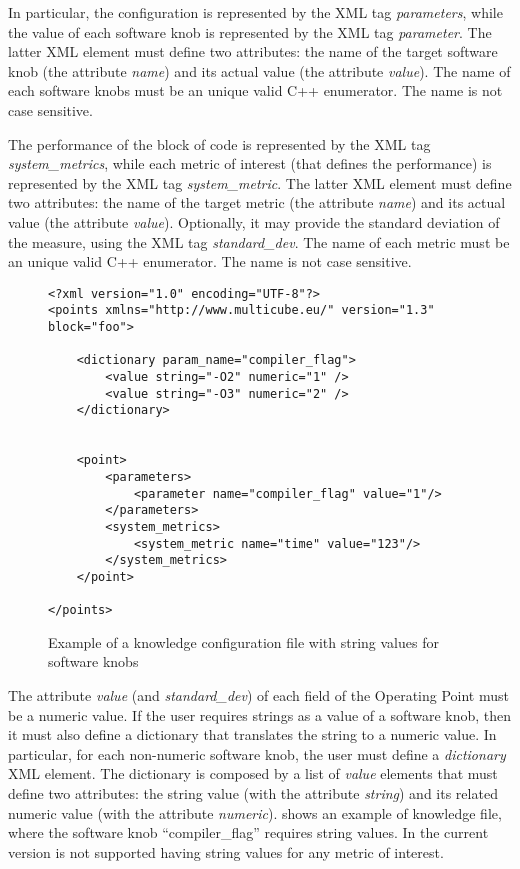 In particular, the configuration is represented by the XML tag \textit{parameters}, while the value of each software knob is represented by the XML tag \textit{parameter}.
The latter XML element must define two attributes: the name of the target software knob (the attribute \textit{name}) and its actual value (the attribute \textit{value}).
The name of each software knobs must be an unique valid C++ enumerator.
The name is not case sensitive.

The performance of the block of code is represented by the XML tag \textit{system\_metrics}, while each metric of interest (that defines the performance) is represented by the XML tag \textit{system\_metric}.
The latter XML element must define two attributes: the name of the target metric (the attribute \textit{name}) and its actual value (the attribute \textit{value}).
Optionally, it may provide the standard deviation of the measure, using the XML tag \textit{standard\_dev}.
The name of each metric must be an unique valid C++ enumerator.
The name is not case sensitive.

\begin{figure}
\lstset{language=XML}
\begin{lstlisting}
<?xml version="1.0" encoding="UTF-8"?>
<points xmlns="http://www.multicube.eu/" version="1.3" block="foo">

	<dictionary param_name="compiler_flag">
		<value string="-O2" numeric="1" />
		<value string="-O3" numeric="2" />
	</dictionary>


	<point>
		<parameters>
			<parameter name="compiler_flag" value="1"/>
		</parameters>
		<system_metrics>
			<system_metric name="time" value="123"/>
		</system_metrics>
	</point>

</points>
\end{lstlisting}
\caption{Example of a knowledge configuration file with string values for software knobs}
\label{code:knowledge_file_dictionary}
\end{figure}

The attribute \textit{value} (and \textit{standard\_dev}) of each field of the Operating Point must be a numeric value.
If the user requires strings as a value of a software knob, then it must also define a dictionary that translates the string to a numeric value.
In particular, for each non-numeric software knob, the user must define a \textit{dictionary} XML element.
The dictionary is composed by a list of \textit{value} elements that must define two attributes: the string value (with the attribute \textit{string}) and its related numeric value (with the attribute \textit{numeric}).
 shows an example of knowledge file, where the software knob ``compiler\_flag'' requires string values.
In the current version is not supported having string values for any metric of interest.


